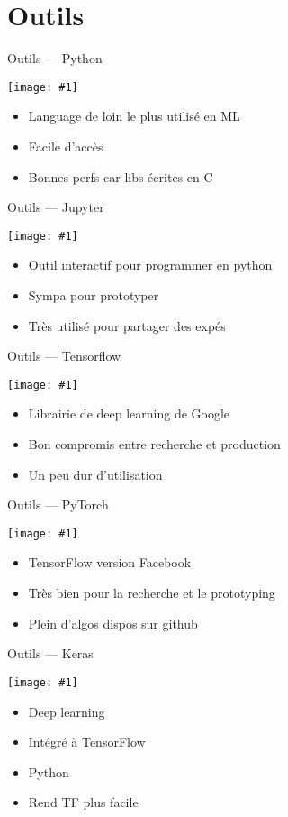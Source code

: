 \documentclass{beamer}
\newcommand\cimgsm[1]{\vfill\centerline{\texttt{[image: \#1]}}\vfill}
\newcommand\cimgt[1]{\centerline{\texttt{[image: \#1]}}\vfill}
\begin{document}
\section{Outils}
\label{sec:outils}
\begin{frame}{Outils --- Python}
  \cimgsm{python.png}
  \begin{itemize}
  \item Language de loin le plus utilisé en ML
  \item Facile d'accès
  \item Bonnes perfs car libs écrites en C
  \end{itemize}
\end{frame}
\begin{frame}{Outils --- Jupyter}
  \cimgsm{jupyter.png}
  \begin{itemize}
  \item Outil interactif pour programmer en python
  \item Sympa pour prototyper
  \item Très utilisé pour partager des expés
  \end{itemize}
\end{frame}
\begin{frame}{Outils --- Tensorflow}
  \cimgsm{tensorflow.png}
  \begin{itemize}
  \item Librairie de deep learning de Google
  \item Bon compromis entre recherche et production
  \item Un peu dur d'utilisation
  \end{itemize}
\end{frame}
\begin{frame}{Outils --- PyTorch}
  \cimgsm{pytorch.png}
  \begin{itemize}
  \item TensorFlow version Facebook
  \item Très bien pour la recherche et le prototyping
  \item Plein d'algos dispos sur github
  \end{itemize}
\end{frame}
\begin{frame}{Outils --- Keras}
  \cimgt{keras.jpg}
  \begin{itemize}
  \item Deep learning
  \item Intégré à TensorFlow
  \item Python
  \item Rend TF plus facile
  \end{itemize}
\end{frame}
\end{document}
